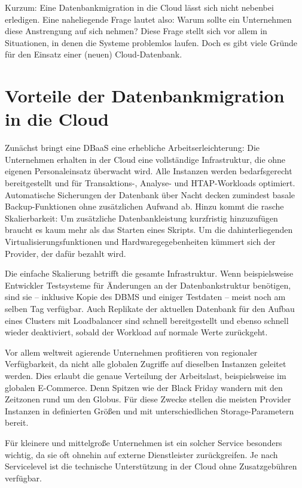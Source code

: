 Kurzum: Eine Datenbankmigration in die Cloud lässt sich nicht nebenbei erledigen. Eine naheliegende Frage lautet also: Warum sollte ein Unternehmen diese Anstrengung auf sich nehmen? Diese Frage stellt sich vor allem in Situationen, in denen die Systeme problemlos laufen. Doch es gibt viele Gründe für den Einsatz einer (neuen) Cloud-Datenbank.

\section{Vorteile der Datenbankmigration in die Cloud}

Zunächst bringt eine DBaaS eine erhebliche Arbeitserleichterung: Die Unternehmen erhalten in der Cloud eine vollständige Infrastruktur, die ohne eigenen Personaleinsatz überwacht wird. Alle Instanzen werden bedarfsgerecht bereitgestellt und für Transaktions-, Analyse- und HTAP-Workloads optimiert. Automatische Sicherungen der Datenbank über Nacht decken zumindest basale Backup-Funktionen ohne zusätzlichen Aufwand ab. Hinzu kommt die rasche Skalierbarkeit: Um zusätzliche Datenbankleistung kurzfristig hinzuzufügen braucht es kaum mehr als das Starten eines Skripts. Um die dahinterliegenden Virtualisierungsfunktionen und Hardwaregegebenheiten kümmert sich der Provider, der dafür bezahlt wird.

Die einfache Skalierung betrifft die gesamte Infrastruktur. Wenn beispielsweise Entwickler Testsysteme für Änderungen an der Datenbankstruktur benötigen, sind sie – inklusive Kopie des DBMS und einiger Testdaten – meist noch am selben Tag verfügbar. Auch Replikate der aktuellen Datenbank für den Aufbau eines Clusters mit Loadbalancer sind schnell bereitgestellt und ebenso schnell wieder deaktiviert, sobald der Workload auf normale Werte zurückgeht.

Vor allem weltweit agierende Unternehmen profitieren von regionaler Verfügbarkeit, da nicht alle globalen Zugriffe auf dieselben Instanzen geleitet werden. Dies erlaubt  die genaue Verteilung der Arbeitslast, beispielsweise im globalen E-Commerce. Denn   Spitzen wie der Black Friday wandern mit den Zeitzonen rund um den Globus. Für    diese Zwecke stellen die meisten Provider Instanzen in definierten Größen und mit unterschiedlichen Storage-Parametern bereit.

Für kleinere und mittelgroße Unternehmen ist ein solcher Service besonders wichtig, da sie oft ohnehin auf externe Dienstleister zurückgreifen. Je nach Servicelevel ist die technische Unterstützung in der Cloud ohne Zusatzgebühren verfügbar.

